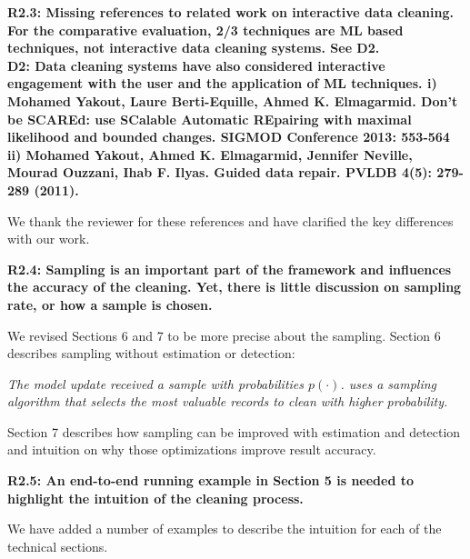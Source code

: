 \noindent\textbf{R2.3: Missing references to related work on interactive data cleaning. For the comparative evaluation, 2/3 techniques are ML based techniques, not interactive data cleaning systems. See D2.\\
D2: Data cleaning systems have also considered interactive engagement with the user and the application of ML techniques. 
i) Mohamed Yakout, Laure Berti-Equille, Ahmed K. Elmagarmid. Don't be SCAREd: use SCalable Automatic REpairing with maximal likelihood and bounded changes. SIGMOD Conference 2013: 553-564
ii) Mohamed Yakout, Ahmed K. Elmagarmid, Jennifer Neville, Mourad Ouzzani, Ihab F. Ilyas.
Guided data repair. PVLDB 4(5): 279-289 (2011).
}

We thank the reviewer for these references and have clarified the key differences with our work. 

\vspace{0.5em}

\textbf{R2.4: Sampling is an important part of the framework and influences the accuracy of the cleaning. Yet, there is little discussion on sampling rate, or how a sample is chosen.}

We revised Sections 6 and 7 to be more precise about the sampling.
Section 6 describes sampling without estimation or detection:

\emph{The model update received a sample with probabilities $p(\cdot)$.
\sys uses a sampling algorithm that selects the most valuable records to clean with higher probability. }

\vspace{0.5em}

Section 7 describes how sampling can be improved with estimation and detection and intuition on why those optimizations improve result accuracy.

\vspace{0.5em}

\textbf{R2.5: An end-to-end running example in Section 5 is needed to highlight the intuition of the cleaning process.}

We have added a number of examples to describe the intuition for each of the technical sections. 

